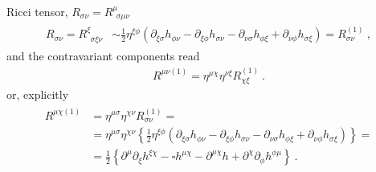 \documentclass[letterpaper,10pt,english]{jupyterBook}
\begin{document}
\sphinxAtStartPar
Ricci tensor, \(R_{\sigma \nu} = R^{\mu}_{\ \ \sigma \mu \nu}\)
\begin{equation*}
\begin{split}\begin{aligned}
  R_{\sigma \nu} = R^{\xi}_{\ \ \sigma \xi \nu}
  & \sim \frac{1}{2} \eta^{\xi \phi} \left( \partial_{\xi \sigma} h_{\phi \nu} - \partial_{\xi \phi} h_{\sigma \nu} - \partial_{\nu \sigma} h_{\phi \xi} + \partial_{\nu \phi} h_{\sigma \xi} \right) = R_{\sigma \nu}^{(1)} \ ,
\end{aligned}\end{split}
\end{equation*}
\sphinxAtStartPar
and the contravariant components read
\begin{equation}\label{equation:ch/relativity-general/linearized-efe:eq:linearize-efe:ricci}
\begin{split}R^{\mu \nu (1)} = \eta^{\mu \chi} \eta^{\nu \xi} R_{\chi \xi}^{(1)} \ .\end{split}
\end{equation}
\sphinxAtStartPar
or, explicitly
\begin{equation*}
\begin{split}\begin{aligned}
  R^{\mu \chi (1)}
  & = \eta^{\mu \sigma} \eta^{\chi \nu} R_{\sigma \nu}^{(1)} = \\
  & = \eta^{\mu \sigma} \eta^{\chi \nu} \left\{ \frac{1}{2} \eta^{\xi \phi} \left( \partial_{\xi \sigma} h_{\phi \nu} - \partial_{\xi \phi} h_{\sigma \nu} - \partial_{\nu \sigma} h_{\phi \xi} + \partial_{\nu \phi} h_{\sigma \xi} \right) \right\} = \\
  & = \frac{1}{2} \left\{ \partial^{\mu} \partial_{\xi} h^{\xi \chi} - \square h^{\mu \chi} - \partial^{\mu \chi} h + \partial^{\chi} \partial_{\phi} h^{\phi \mu} \right\} \ .
\end{aligned}\end{split}
\end{equation*}
\end{document}
